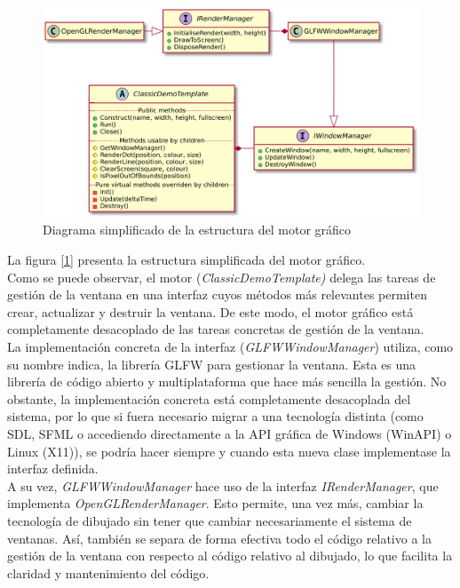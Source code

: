 \begin{figure}[h]
	\centering
	\includegraphics[width=15cm]{archivos/classicdemotemplateuml}
	\caption{Diagrama simplificado de la estructura del motor gráfico}
	\label{fig:classicdemotemplateuml}
\end{figure}

La figura [\ref{fig:classicdemotemplateuml}] presenta la estructura simplificada del motor gráfico.\\

Como se puede observar, el motor (\emph{ClassicDemoTemplate)} delega las tareas de gestión de la ventana en una interfaz cuyos métodos más relevantes permiten crear, actualizar y destruir la ventana. De este modo, el motor gráfico está completamente desacoplado de las tareas concretas de gestión de la ventana.\\

La implementación concreta de la interfaz (\emph{GLFWWindowManager}) utiliza, como su nombre indica, la librería GLFW para gestionar la ventana. Esta es una librería de código abierto y multiplataforma que hace más sencilla la gestión. No obstante, la implementación concreta está completamente desacoplada del sistema, por lo que si fuera necesario migrar a una tecnología distinta (como SDL, SFML o accediendo directamente a la API gráfica de Windows (WinAPI) o Linux (X11)), se podría hacer siempre y cuando esta nueva clase implementase la interfaz definida.\\

A su vez, \emph{GLFWWindowManager} hace uso de la interfaz \emph{IRenderManager}, que implementa \emph{OpenGLRenderManager}. Esto permite, una vez más, cambiar la tecnología de dibujado sin tener que cambiar necesariamente el sistema de ventanas. Así, también se separa de forma efectiva todo el código relativo a la gestión de la ventana con respecto al código relativo al dibujado, lo que facilita la claridad y mantenimiento del código.\\

